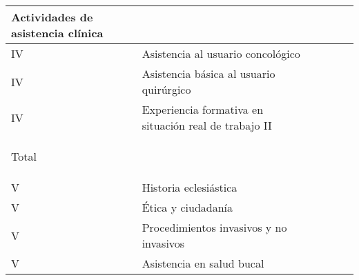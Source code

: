 \documentclass[9pt,a4paper]{article}
\begin{document}
\begin{table}[ht]
\begin{tabular}{|m{0.7cm}|m{7cm}|m{1.4cm}|m{1.4cm}|m{1.4cm}|m{1.4cm}|}
		Actividades de asistencia clínica    & 
		{\parbox{1.4cm}{ }}      & 
		{\parbox{1.4cm}{}}      & 
		{\parbox{1.4cm}{ }}     & 
		{\parbox{1.4cm}{ }}     \\
		\hline	
		{\parbox{0.7cm}{\centering IV}}      & 
		Asistencia al usuario concológico    & 
		{\parbox{1.4cm}{ }}      & 
		{\parbox{1.4cm}{}}      & 
		{\parbox{1.4cm}{ }}      & 
		{\parbox{1.4cm}{ }}     \\
		\hline
		{\parbox{0.7cm}{\centering IV}}      & 
		Asistencia básica al usuario quirúrgico & 
		{\parbox{1.4cm}{ }}      & 
		{\parbox{1.4cm}{}}      & 
		{\parbox{1.4cm}{ }}     & 
		{\parbox{1.4cm}{ }}     \\
		\hline
		{\parbox{0.7cm}{\centering IV}}      & 
		Experiencia formativa en situación real de trabajo II & 
		{\parbox{1.4cm}{ }}      & 
		{\parbox{1.4cm}{ }}      & 
		{\parbox{1.4cm}{}}     & 
		{\parbox{1.4cm}{ }}     \\
		\hline
		\rowcolor{azul}
		\textcolor{blanco}{\parbox{0.7cm}{\centering Total}}    & 
		                                                        & 
		\textcolor{blanco}{\parbox{1.4cm}{ }}      & 
		\textcolor{blanco}{\parbox{1.4cm}{ }}     & 
		\textcolor{blanco}{\parbox{1.4cm}{  }}    & 
		\textcolor{blanco}{\parbox{1.4cm}{ }}     \\
		\hline
		{\parbox{0.7cm}{\centering V}}       & 
		Historia eclesiástica                & 
		{\parbox{1.4cm}{ }}      & 
		{\parbox{1.4cm}{}}      & 
		{\parbox{1.4cm}{ }}      & 
		{\parbox{1.4cm}{ }}     \\
		\hline	
		{\parbox{0.7cm}{\centering V}}       & 
		Ética y ciudadanía                   & 
		{\parbox{1.4cm}{ }}      & 
		{\parbox{1.4cm}{}}      & 
		{\parbox{1.4cm}{ }}      & 
		{\parbox{1.4cm}{ }}     \\
		\hline
		{\parbox{0.7cm}{\centering V}}       & 
		Procedimientos invasivos y no invasivos & 
		{\parbox{1.4cm}{ }}      & 
		{\parbox{1.4cm}{}}      & 
		{\parbox{1.4cm}{}}      & 
		{\parbox{1.4cm}{}}     \\
		\hline
		{\parbox{0.7cm}{\centering V}}       & 
		Asistencia en salud bucal            & 

\end{tabular}
\end{table}
\end{document}
